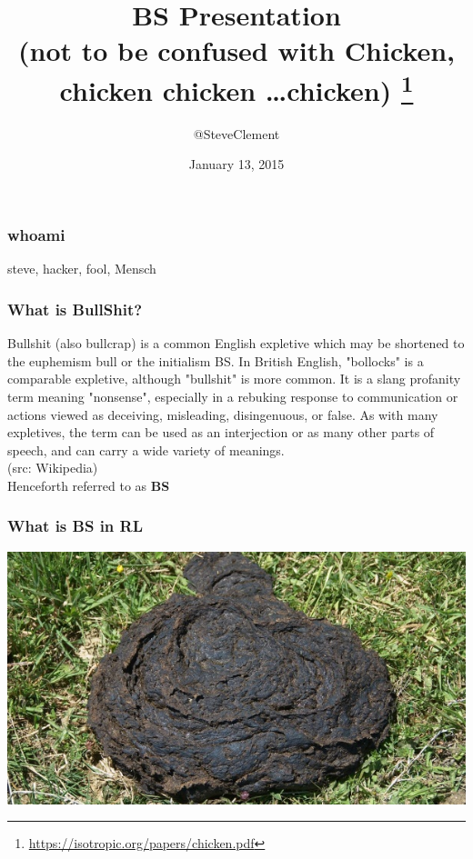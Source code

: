 \documentclass[a4paper]{beamer}
\begin{document}
\title{BS Presentation\\(not to be confused with Chicken, chicken chicken \ldots  chicken) \footnote{\url{https://isotropic.org/papers/chicken.pdf}}}
\author{@SteveClement} 
\date{January 13, 2015} 


\frame{\titlepage} 

\begin{frame}
\frametitle{whoami} 
steve, hacker, fool, Mensch
\end{frame}

\begin{frame}
\frametitle{What is BullShit?} 
Bullshit (also bullcrap) is a common English expletive which may be shortened to the euphemism bull or the initialism BS. In British English, "bollocks" is a comparable expletive, although "bullshit" is more common. It is a slang profanity term meaning "nonsense", especially in a rebuking response to communication or actions viewed as deceiving, misleading, disingenuous, or false. As with many expletives, the term can be used as an interjection or as many other parts of speech, and can carry a wide variety of meanings. \\ (src: Wikipedia)
\\
Henceforth referred to as {\bf BS}
\end{frame}

\begin{frame}
\frametitle{What is BS in RL}
\begin{center}
\includegraphics[scale=0.60]{img/cowpat.jpg}
\end{center}
\end{frame}
\end{document}

